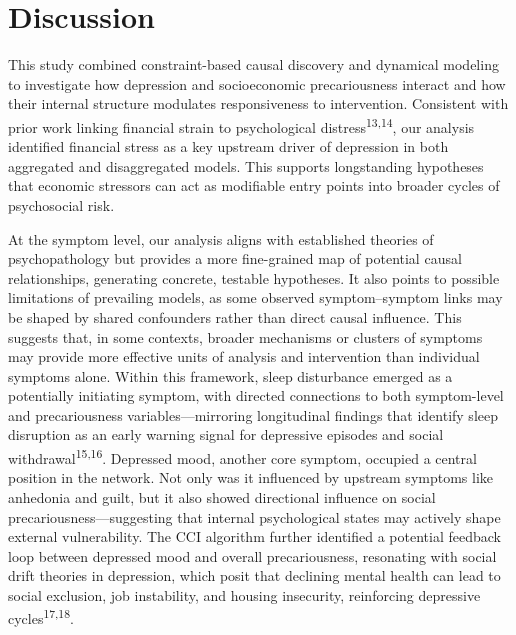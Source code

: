 \documentclass[
]{article}
\begin{document}
\restoregeometry

\section{Discussion}\label{discussion}

This study combined constraint-based causal discovery and dynamical
modeling to investigate how depression and socioeconomic precariousness
interact and how their internal structure modulates responsiveness to
intervention. Consistent with prior work linking financial strain to
psychological distress\textsuperscript{13,14}, our analysis identified
financial stress as a key upstream driver of depression in both
aggregated and disaggregated models. This supports longstanding
hypotheses that economic stressors can act as modifiable entry points
into broader cycles of psychosocial risk.

At the symptom level, our analysis aligns with established theories of
psychopathology but provides a more fine-grained map of potential causal
relationships, generating concrete, testable hypotheses. It also points
to possible limitations of prevailing models, as some observed
symptom--symptom links may be shaped by shared confounders rather than
direct causal influence. This suggests that, in some contexts, broader
mechanisms or clusters of symptoms may provide more effective units of
analysis and intervention than individual symptoms alone. Within this
framework, sleep disturbance emerged as a potentially initiating
symptom, with directed connections to both symptom-level and
precariousness variables---mirroring longitudinal findings that identify
sleep disruption as an early warning signal for depressive episodes and
social withdrawal\textsuperscript{15,16}. Depressed mood, another core
symptom, occupied a central position in the network. Not only was it
influenced by upstream symptoms like anhedonia and guilt, but it also
showed directional influence on social precariousness---suggesting that
internal psychological states may actively shape external vulnerability.
The CCI algorithm further identified a potential feedback loop between
depressed mood and overall precariousness, resonating with social drift
theories in depression, which posit that declining mental health can
lead to social exclusion, job instability, and housing insecurity,
reinforcing depressive cycles\textsuperscript{17,18}.
\end{document}
